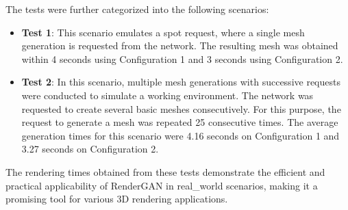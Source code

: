 The tests were further categorized into the following scenarios:

\begin{itemize}
\item \textbf{Test 1}: This scenario emulates a spot request, where a single mesh generation is requested from the network. The resulting mesh was obtained within 4 seconds using Configuration 1 and 3 seconds using Configuration 2.
\item \textbf{Test 2}: In this scenario, multiple mesh generations with successive requests were conducted to simulate a working environment. The network was requested to create several basic meshes consecutively. For this purpose, the request to generate a mesh was repeated 25 consecutive times. The average generation times for this scenario were 4.16 seconds on Configuration 1 and 3.27 seconds on Configuration 2.
\end{itemize}

The rendering times obtained from these tests demonstrate the efficient and practical applicability of RenderGAN in real_world scenarios, making it a promising tool for various 3D rendering applications.

